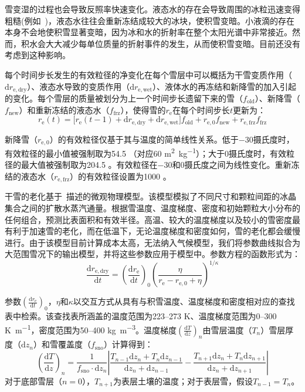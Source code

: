 雪变湿的过程也会导致反照率快速变化。液态水的存在会导致周围的冰粒迅速变得粗糙(例如~\citet{brun1989InvestigationWetSnowMetamorphism})，液态水往往会重新冻结成较大的冰块，使积雪变暗。小液滴的存在本身不会地使积雪显著变暗，因为冰和水的折射率在整个太阳光谱中非常接近。然而，积水会大大减少每单位质量的折射事件的发生，从而使积雪变暗。目前还没有考虑到这种影响。

每个时间步长发生的有效粒径的净变化在每个雪层中可以概括为干雪变质作用（${\mathrm d}r_{\mathrm{e,dry}}$）、液态水导致的变质作用（${\mathrm d}r_{\mathrm {e,wet}}$）、液体水的再冻结和新降雪的加入引起的变化。每个雪层的质量被划分为上一个时间步长遗留下来的雪（$f_{\mathrm{old}}$）、新降雪（$f_{\mathrm{new}}$）和重新冻结的液态水（$f_{\mathrm{frz}}$），使得雪的$r_{\mathrm e}$在每个时间步长${t}$更新为：
\begin{equation}
  r_{\mathrm e}(t) = \lbrack r_{\mathrm e}(t - 1) + {{\mathrm d}r}_{\mathrm {e,dry}} + {{\mathrm d}r}_{\mathrm {e,wet}}\rbrack f_{\mathrm{old}} + r_{\mathrm e,0}f_{\mathrm{new}} + r_{\mathrm{e,frz}}f_{\mathrm{frz}}
\end{equation}

新降雪（$r_{\mathrm {e,0}}$）的有效粒径仅基于其与温度的简单线性关系。低于$-30$摄氏度时，有效粒径的最小值被强制取为54.5 \unit{}（对应60 \unit{m^{2}.kg^{-1}}）；大于0摄氏度时，有效粒径的最大值被强制取为204.5 \unit{}。有效粒径在$-30$和0摄氏度之间为线性变化。重新冻结的液态水（$r_{\mathrm {e,frz}}$）的有效粒径设置为1000 \unit{}。

干雪的老化基于~\citet{flanner2006LinkingSnowpackMicrophysics}描述的微观物理模型。该模型模拟了不同尺寸和颗粒间距的冰晶集合之间的扩散水蒸汽通量。根据雪温度、温度梯度、密度和初始颗粒大小分布的任何组合，预测比表面积和有效半径。高温、较大的温度梯度以及较小的雪密度最有利于加速雪的老化，而在低温下，无论温度梯度和密度如何，雪的老化都会缓慢进行。由于该模型目前计算成本太高，无法纳入气候模型，我们将参数曲线拟合为大范围雪况下的输出模型，并将这些参数应用于模型中。参数方程的函数形式为：
\begin{equation}
  \frac{{{\mathrm d}r}_{\mathrm {e,dry}}}{{\mathrm d}t} = \left( \frac{{{\mathrm d}r}_{\mathrm e}}{{\mathrm d}t} \right)_{0}\left( \frac{\eta}{r_{\mathrm e} - r_{\mathrm {e,0}} + \eta} \right)^{1/\kappa}
\end{equation}

参数$\left( \frac{{{\mathrm d}r}_{\mathrm e}}{{\mathrm d}t} \right)_{0}$，$\eta$和$\kappa$以交互方式从具有与积雪温度、温度梯度和密度相对应的查找表中检索。该查找表所涵盖的温度范围为223--273 K、温度梯度范围为0--300 \unit{K.m^{-1}}，密度范围为50--400 \unit{kg.m^{-3}}。温度梯度$\left( \frac{{\mathrm d}T}{{\mathrm d}z} \right)_{n}$由雪层温度（$T_n$）雪层厚度（${\mathrm d}z_n$）和雪覆盖度（$f_{\mathrm{sno}}$）计算得到：
%
\begin{equation}
  \left( \frac{{\mathrm d}T}{{\mathrm d}z} \right)_{n} = \frac{1}{f_{\mathrm{sno}}\cdot {{\mathrm d}z}_{n}}\left| \frac{T_{n - 1}{{\mathrm d}z}_{n} + T_{n}{{\mathrm d}z}_{n - 1}}{{{\mathrm d}z}_{n} + {{\mathrm d}z}_{n - 1}} - \frac{T_{n + 1}{{\mathrm d}z}_{n} + T_{n}{{\mathrm d}z}_{n + 1}}{{{\mathrm d}z}_{n} + {{\mathrm d}z}_{n + 1}} \right|
\end{equation}
%
对于底部雪层（$n=0$），$T_{n+1}$为表层土壤的温度；对于表层雪，假设$T_{n-1}=T_n$。


